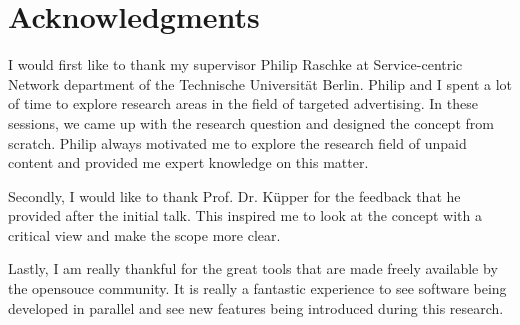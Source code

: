 \chapter*{Acknowledgments}
\label{cha:acknowledgments}

I would first like to thank my supervisor Philip Raschke at Service-centric Network department of the Technische Universität Berlin. Philip and I spent a lot of time to explore research areas in the field of targeted advertising. In these sessions, we came up with the research question and designed the concept from scratch. Philip always motivated me to explore the research field of unpaid content and provided me expert knowledge on this matter. 

Secondly, I would like to thank Prof. Dr. Küpper for the feedback that he provided after the initial talk. This inspired me to look at the concept with a critical view and make the scope more clear.

Lastly, I am really thankful for the great tools that are made freely available by the opensouce community. It is really a fantastic experience to see software being developed in parallel and see new features being introduced during this research. 